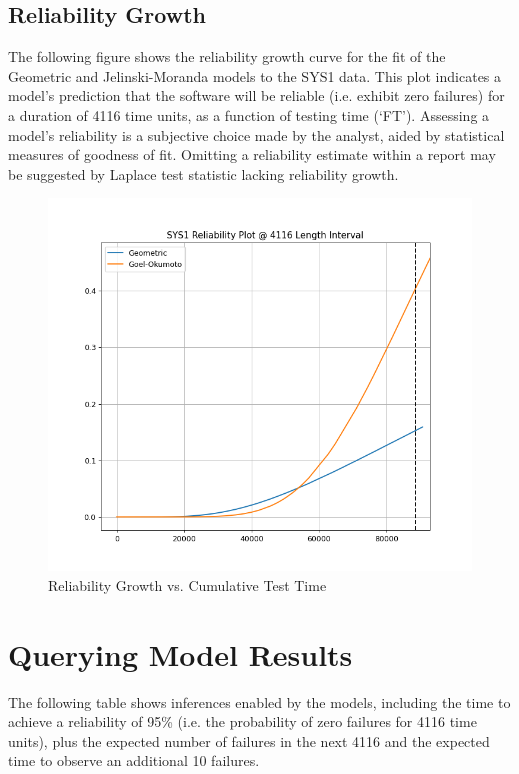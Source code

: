 \documentclass{article}
\begin{document}
\newpage

\subsection{Reliability Growth}
The following figure shows the reliability growth curve for the fit of the Geometric and Jelinski-Moranda models to the SYS1 data. This plot indicates a model's prediction that the software will be reliable (i.e. exhibit zero failures) for a duration of 4116 time units, as a function of testing time (`FT'). Assessing a model's reliability is a subjective choice made by the analyst, aided by statistical measures of goodness of fit. Omitting a reliability estimate within a report may be suggested by Laplace test statistic lacking reliability growth.

\begin{figure}[h!]
\centering
\includegraphics[width=\textwidth]{relplot2.png}
\caption{Reliability Growth vs. Cumulative Test Time}
\label{fig:relplot}
\end{figure}


\newpage


\section{Querying Model Results}
The following table shows inferences enabled by the models, including the time to achieve a reliability of 95\% (i.e. the probability of zero failures for 4116 time units), plus the expected number of failures in the next 4116 and the expected time to observe an additional 10 failures.
\end{document}
